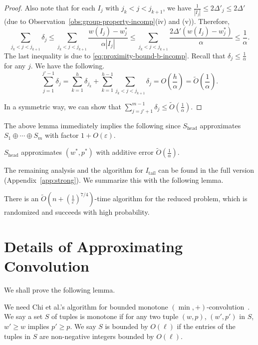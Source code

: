 \documentclass[a4paper,UKenglish,cleveref, autoref, thm-restate, pdfa]{lipics-v2021}
\newcommand{\eps}{\varepsilon}
\renewcommand{\leq}{\leqslant}
\renewcommand{\geq}{\geqslant}
\begin{document}
\begin{proof}
   Also note that for each $I_j$ with $j_k < j < j_{k+1}$, we have $\frac{1}{|I_j|} \leq 2\Delta'_j \leq 2\Delta'$ (due to Observation~\ref{obs:group-property-incomp}(iv) and (v)). 
   Therefore, 
   \[
        \sum_{j_k < j < j_{k+1}} \delta_j \leq \sum_{j_k < j < j_{k+1}} \frac{w(I_j) - w^*_j}{\alpha|I_j|} \leq \sum_{j_k < j < j_{k+1}} \frac{2\Delta'(w(I_j) - w^*_j)}{\alpha} \leq \frac{1}{\alpha}.
   \]
   The last inequality is due to \eqref{eq:proximity-bound-b-incomp}.
   Recall that $\delta_j \leq \frac{1}{\alpha}$ for any $j$. We have the following.
   \[
        \sum_{j=1}^{j'-1} \delta_j  = \sum_{k=1}^h \delta_{j_k}  + \sum_{k=1}^{h-1}\sum_{j_k < j < j_{k+1}} \delta_j = O(\frac{h}{\alpha}) = \tilde{O}(\frac{1}{\alpha}).
   \]

   In a symmetric way, we can show that 
   \(
       \sum_{j=j'+ 1}^{m-1} \delta_j  \leq \tilde{O}(\frac{1}{\alpha}).
   \) 
\end{proof}

The above lemma immediately implies the following since $S_{\mathrm{head}}$ approximates $ S_1 \oplus \cdots \oplus S_m$ with factor $1 + O(\eps)$.
\begin{corollary}
    $S_{\mathrm{head}}$ approximates $(w^*, p^*)$ with additive error $\tilde{O}(\frac{1}{\alpha})$.
\end{corollary}

The remaining analysis and the algorithm for $I_{\mathrm{tail}}$ can be found in the full version (Appendix~\ref{app:strong}). We summarize this with the following lemma.
\begin{lemma}
   There is an $\tilde{O}({n+(\frac{1}{\eps})^{7/4}})$-time algorithm for the reduced problem, which is randomized and succeeds with high probability.
\end{lemma}



\clearpage
\appendix

\section{Details of Approximating Convolution}\label{app:conv}
We shall prove the following lemma.
\lemmerging*


We need Chi et al.'s algorithm for bounded monotone $(\min,+)$-convolution~\cite{CDXZ22}. We say a set $S$ of tuples is monotone if for any two tuple $(w, p)$, $(w', p')$ in $S$, $w' \geq w$ implies $p' \geq p$. We say $S$ is bounded by $O(\ell)$ if the entries of the tuples in $S$ are non-negative integers bounded by $O(\ell)$. 
\end{document}
